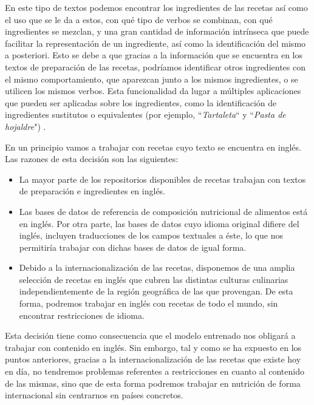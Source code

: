 En este tipo de textos podemos encontrar los ingredientes de las recetas así como el uso que se le da a estos, con qué tipo de verbos se combinan, con qué ingredientes se mezclan, y una gran cantidad de información intrínseca que puede facilitar la representación de un ingrediente, así como la identificación del mismo a posteriori. Esto se debe a que gracias a la información que se encuentra en los textos de preparación de las recetas, podríamos identificar otros ingredientes con el mismo comportamiento, que aparezcan junto a los mismos ingredientes, o se utilicen los mismos verbos. Esta funcionalidad da lugar a múltiples aplicaciones que pueden ser aplicadas sobre los ingredientes, como la identificación de ingredientes sustitutos o equivalentes (por ejemplo, ``\textit{Tartaleta}`` y ``\textit{Pasta de hojaldre}") .

En un principio vamos a trabajar con recetas cuyo texto se encuentra en inglés. Las razones de esta decisión son las siguientes: 

\begin{itemize}
    \item La mayor parte de los repositorios disponibles de recetas trabajan con textos de preparación e ingredientes en inglés. 
    
    \item Las bases de datos de referencia de composición nutricional de alimentos está en inglés. Por otra parte, las bases de datos cuyo idioma original difiere del inglés, incluyen traducciones de los campos textuales a éste, lo que nos permitiría trabajar con dichas bases de datos de igual forma. 
    
    \item Debido a la internacionalización de las recetas, disponemos de una amplia selección de recetas en inglés que cubren las distintas culturas culinarias independientemente de la región geográfica de las que provengan. De esta forma, podremos trabajar en inglés con recetas de todo el mundo, sin encontrar restricciones de idioma. 
\end{itemize}

Esta decisión tiene como consecuencia que el modelo entrenado nos obligará a trabajar con contenido en inglés. Sin embargo, tal y como se ha expuesto en los puntos anteriores, gracias a la internacionalización de las recetas que existe hoy en día, no tendremos problemas referentes a restricciones en cuanto al contenido de las mismas, sino que de esta forma podremos trabajar en nutrición de forma internacional sin centrarnos en países concretos. 


